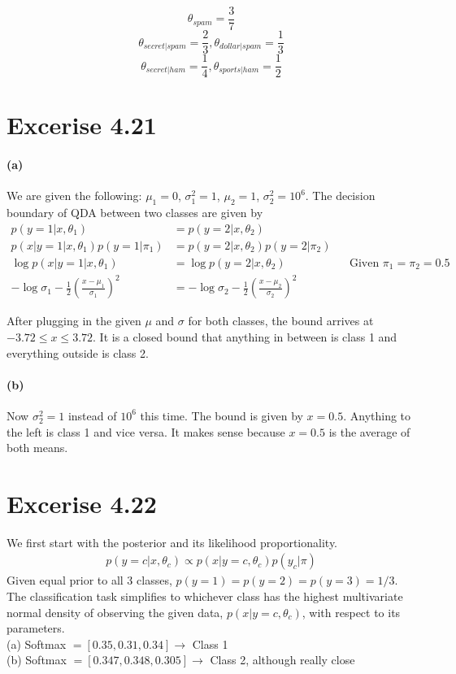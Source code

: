 \documentclass[12pt, letterpaper]{article}
\begin{document}
\[ \theta_{spam} = \frac{3}{7} \]
\[ \theta_{secret|spam} = \frac{2}{3}, \theta_{dollar|spam} = \frac{1}{3} \]
\[ \theta_{secret|ham} = \frac{1}{4}, \theta_{sports|ham} = \frac{1}{2} \]

\section{Excerise 4.21}
\paragraph{(a)} 
We are given the following: $\mu_1 = 0$, $\sigma_1^2 = 1$, $\mu_2 = 1$, $\sigma_2^2 = 10^6$.
The decision boundary of QDA between two classes are given by
\begin{align*}
    p(y=1 | x, \theta_1) &= p(y=2 | x, \theta_2) \\
    p(x|y=1 | x, \theta_1) p(y=1|\pi_1) &= p(y=2|x,\theta_2)p(y=2|\pi_2) \\
    \log p(x|y=1 | x, \theta_1) &= \log p(y=2|x,\theta_2) && \text{Given $\pi_1 = \pi_2 = 0.5$} \\
    -\log \sigma_1 - \frac{1}{2}(\frac{x-\mu_1}{\sigma_1})^2 &= -\log \sigma_2 - \frac{1}{2}(\frac{x-\mu_2}{\sigma_2})^2
\end{align*}

After plugging in the given $\mu$ and $\sigma$ for both classes, the bound arrives at $-3.72 \le x \le 3.72$. It is a closed
bound that anything in between is class 1 and everything outside is class 2.

\paragraph{(b)}
Now $\sigma_2^2 = 1$ instead of $10^6$ this time. The bound is given by $x = 0.5$. Anything to the left is class 1 and vice versa.
It makes sense because $x = 0.5$ is the average of both means.

\section{Excerise 4.22}
We first start with the posterior and its likelihood proportionality.
\begin{align*}
    p(y=c|x,\theta_c) \propto p(x|y=c,\theta_c)p(y_c|\pi)
\end{align*}
Given equal prior to all 3 classes, $p(y=1) = p(y=2) = p(y=3) = 1/3$. The classification task simplifies to
whichever class has the highest multivariate normal density of observing the given data, $p(x|y=c,\theta_c)$,
with respect to its parameters. \\
(a) Softmax $= [0.35, 0.31, 0.34] \rightarrow $ Class 1 \\
(b) Softmax $= [0.347, 0.348, 0.305] \rightarrow $ Class 2, although really close
\end{document}

